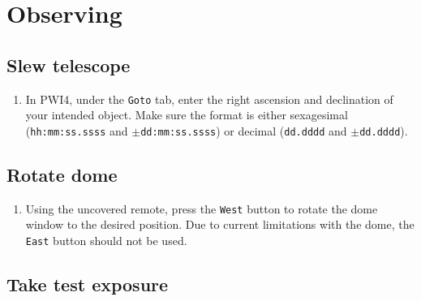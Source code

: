 \documentclass{article}
\begin{document}
	\newpage
	\section{Observing}
	\label{sec:observing}
	
	\subsection{Slew telescope}
	\label{sec:slew-telescope}
	
	\begin{enumerate}
		
		\item In PWI4, under the \texttt{Goto} tab, enter the right ascension and declination of your intended object. Make sure the format is either sexagesimal (\texttt{hh:mm:ss.ssss} and \texttt{$\pm$dd:mm:ss.ssss}) or decimal (\texttt{dd.dddd} and \texttt{$\pm$dd.dddd}).
		
	\end{enumerate}

	\subsection{Rotate dome}
	\label{sec:rotate-dome}
	
	\begin{enumerate}
		
		\item Using the uncovered remote, press the \texttt{West} button to rotate the dome window to the desired position. Due to current limitations with the dome, the \texttt{East} button should not be used.
		
	\end{enumerate}
	
	\subsection{Take test exposure}
	\label{sec:take-test-exposure}
	
\end{document}
